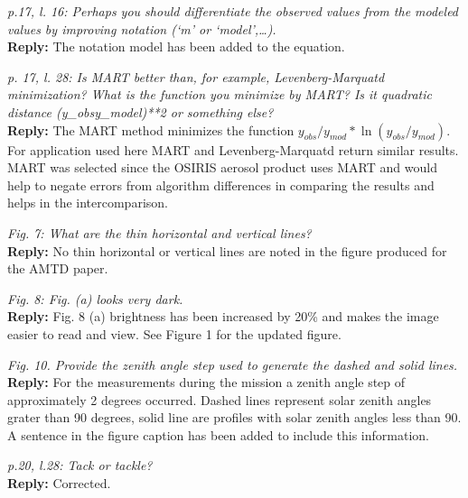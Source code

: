 \documentclass[12pt, notitlepage]{article}
\begin{document}
\textit{p.17, l. 16: Perhaps you should differentiate the observed values from the modeled values by improving notation (`m' or `model',\ldots).}\\

\textbf{Reply:} The notation model has been added to the equation.

\hrulefill

\textit{p. 17, l. 28: Is MART better than, for example, Levenberg-Marquatd minimization?
What is the function you minimize by MART? Is it quadratic distance (y\_obsy\_model)**2
or something else?}\\

\textbf{Reply:} The MART method minimizes the function $y_{obs}/y_{mod}*\ln(y_{obs}/y_{mod})$. For application
used here MART and Levenberg-Marquatd return similar results. MART was selected since the OSIRIS aerosol
product uses MART and would help to negate errors from algorithm differences in comparing the results and helps in the intercomparison.

\hrulefill

\textit{Fig. 7: What are the thin horizontal and vertical lines?}\\

\textbf{Reply:} No thin horizontal or vertical lines are noted in the figure produced for the AMTD paper.

\hrulefill

\textit{Fig. 8: Fig. (a) looks very dark.}\\

\textbf{Reply:} Fig. 8 (a) brightness has been increased by 20\% and makes the image easier to read and view. See Figure 1 for the updated figure.

\hrulefill

\textit{Fig. 10. Provide the zenith angle step used to generate the dashed and solid lines.}\\

\textbf{Reply:} For the measurements during the mission a zenith angle step of approximately 2 degrees occurred.
Dashed lines represent solar zenith angles grater than 90 degrees, solid line are profiles with solar zenith angles less than 90.
A sentence in the figure caption has been added to include this information.

\hrulefill

\textit{p.20, l.28: Tack or tackle?}\\

\textbf{Reply:} Corrected.
\end{document}
